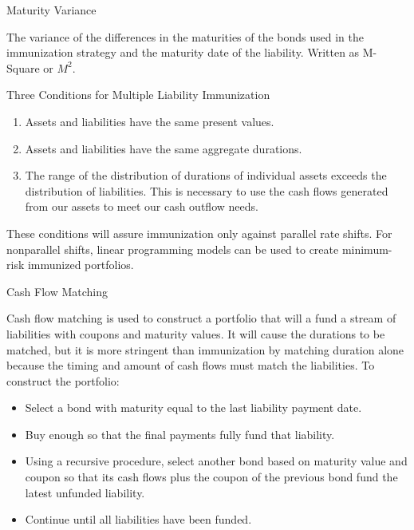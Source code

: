 \documentclass[../custom]{flashcards}
\begin{document}
\begin{flashcard}{Maturity Variance}
    \begin{flushleft}
        The variance of the differences in the maturities of the bonds used in the immunization strategy and the maturity date of the liability. Written as M-Square or $M^2$.
    \end{flushleft}
\end{flashcard}

\begin{flashcard}{Three Conditions for Multiple Liability Immunization}
    \begin{flushleft}
        \begin{enumerate}
            \item Assets and liabilities have the same present values.
            \item Assets and liabilities have the same aggregate durations.
            \item The range of the distribution of durations of individual assets exceeds the distribution of liabilities. This is necessary to use the cash flows generated from our assets to meet our cash outflow needs.
        \end{enumerate}
        These conditions will assure immunization only against parallel rate shifts. For nonparallel shifts, linear programming models can be used to create minimum-risk immunized portfolios.
    \end{flushleft}
\end{flashcard}

\begin{flashcard}{Cash Flow Matching}
    \begin{flushleft}
        Cash flow matching is used to construct a portfolio that will a fund a stream of liabilities with coupons and maturity values. It will cause the durations to be matched, but it is more stringent than immunization by matching duration alone because the timing and amount of cash flows must match the liabilities. To construct the portfolio:
    \begin{itemize}
        \item Select a bond with maturity equal to the last liability payment date.
        \item Buy enough so that the final payments fully fund that liability.
        \item Using a recursive procedure, select another bond based on maturity value and coupon so that its cash flows plus the coupon of the previous bond fund the latest unfunded liability.
        \item Continue until all liabilities have been funded.
    \end{itemize}
    \end{flushleft}
\end{flashcard}
\end{document}
